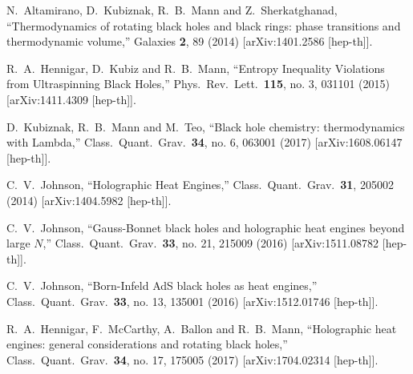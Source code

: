 \documentclass[preprint,showpacs,showkeys,onecolumn,nofootinbib]{revtex4}
\begin{document}
\begin{thebibliography}{99}
  N.~Altamirano, D.~Kubiznak, R.~B.~Mann and Z.~Sherkatghanad,
  ``Thermodynamics of rotating black holes and black rings: phase transitions and thermodynamic volume,''
  Galaxies {\bf 2}, 89 (2014)
  [arXiv:1401.2586 [hep-th]].

  R.~A.~Hennigar, D.~Kubiz and R.~B.~Mann,
  ``Entropy Inequality Violations from Ultraspinning Black Holes,''
  Phys.\ Rev.\ Lett.\  {\bf 115}, no. 3, 031101 (2015)
  [arXiv:1411.4309 [hep-th]].


  D.~Kubiznak, R.~B.~Mann and M.~Teo,
  ``Black hole chemistry: thermodynamics with Lambda,''
  Class.\ Quant.\ Grav.\  {\bf 34}, no. 6, 063001 (2017)
  [arXiv:1608.06147 [hep-th]].


  C.~V.~Johnson,
  ``Holographic Heat Engines,''
  Class.\ Quant.\ Grav.\  {\bf 31}, 205002 (2014)
  [arXiv:1404.5982 [hep-th]].

  C.~V.~Johnson,
  ``Gauss-Bonnet black holes and holographic heat engines beyond large $N$,''
  Class.\ Quant.\ Grav.\  {\bf 33}, no. 21, 215009 (2016)
  [arXiv:1511.08782 [hep-th]].


  C.~V.~Johnson,
  ``Born-Infeld AdS black holes as heat engines,''
  Class.\ Quant.\ Grav.\  {\bf 33}, no. 13, 135001 (2016)
  [arXiv:1512.01746 [hep-th]].

  R.~A.~Hennigar, F.~McCarthy, A.~Ballon and R.~B.~Mann,
  ``Holographic heat engines: general considerations and rotating black holes,''
  Class.\ Quant.\ Grav.\  {\bf 34}, no. 17, 175005 (2017)
  [arXiv:1704.02314 [hep-th]].


\end{thebibliography}
\end{document}
